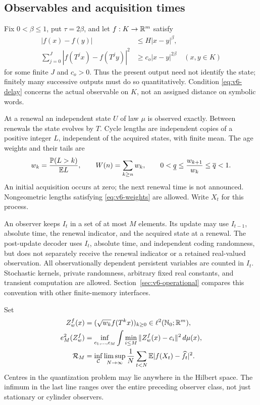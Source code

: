 \subsection{Observables and acquisition times}
Fix $0<\beta\le1$, put $\tau=2\beta$, and let $f:K\to\mathbb R^m$ satisfy
\begin{align}
 |f(x)-f(y)|&\le H|x-y|^\beta,\label{eq:v6-holder}\\
 \sum_{j=0}^J|f(T^jx)-f(T^jy)|^2&\ge c_o|x-y|^{2\beta}
                \quad(x,y\in K)                         \label{eq:v6-delay}
\end{align}
for some finite $J$ and $c_o>0$. Thus the present output need not identify
the state; finitely many successive outputs must do so quantitatively.
Condition \eqref{eq:v6-delay} concerns the actual observable on $K$, not
an assigned distance on symbolic words.

At a renewal an independent state $U$ of law $\mu$ is observed exactly.
Between renewals the state evolves by $T$. Cycle lengths are independent
copies of a positive integer $L$, independent of the acquired states,
with finite mean. The age weights and their tails are
\begin{equation}
 w_k=\frac{\mathbb P(L>k)}{\mathbb E L},\qquad W(n)=\sum_{k\ge n}w_k,
 \qquad
 0<\underline q\le\frac{w_{k+1}}{w_k}\le\overline q<1.
                                                        \label{eq:v6-weights}
\end{equation}
An initial acquisition occurs at zero; the next renewal time is not
announced. Nongeometric lengths satisfying \eqref{eq:v6-weights} are
allowed. Write $X_t$ for this process.

An observer keeps $I_t$ in a set of at most $M$ elements. Its update may
use $I_{t-1}$, absolute time, the renewal indicator, and the acquired
state at a renewal. The post-update decoder uses $I_t$, absolute time,
and independent coding randomness, but does not separately receive the
renewal indicator or a retained real-valued observation. All
observationally dependent persistent variables are counted in $I_t$.
Stochastic kernels, private randomness, arbitrary fixed real constants,
and transient computation are allowed. Section~\ref{sec:v6-operational}
compares this convention with other finite-memory interfaces.

Set
\begin{align}
 Z_w^f(x)&=(\sqrt{w_k}f(T^kx))_{k\ge0}\in\ell^2(\mathbb N_0;\mathbb R^m),\nonumber\\
 e_M^2(Z_w^f)&=\inf_{c_1,\ldots,c_M}
       \int\min_{i\le M}\|Z_w^f(x)-c_i\|^2\,d\mu(x),\nonumber\\
 \mathcal R_M&=\inf_{\mathcal C}\limsup_{N\to\infty}\frac1N
       \sum_{t<N}\mathbb E|f(X_t)-\widehat f_t|^2.                \label{eq:v6-risk}
\end{align}
Centres in the quantization problem may lie anywhere in the Hilbert
space. The infimum in the last line ranges over the entire preceding
observer class, not just stationary or cylinder observers.

